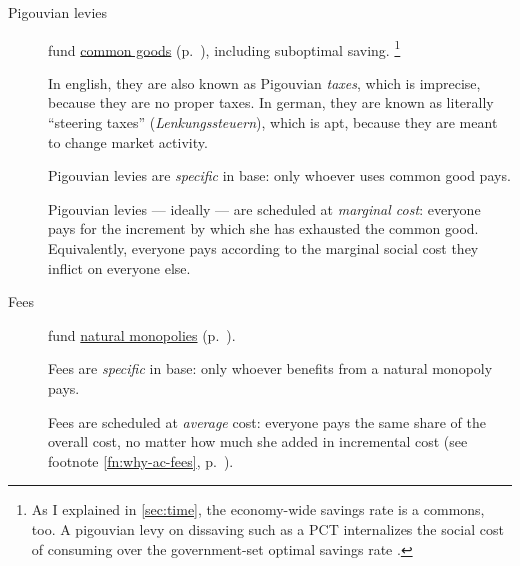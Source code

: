 \begin{description}
	\item[Pigouvian levies]  \label{sec:levies} fund \hyperref[sec:common-good]{common goods} (p.~\pageref{sec:common-good}), including suboptimal saving.
	\footnote{
		As I explained in \autoref{sec:time}, the economy-wide savings rate is a commons, too.
		A pigouvian levy on dissaving such as a \gls{PCT} internalizes the social cost of consuming over the government-set optimal savings rate \citep{Held2010a}.
	}

	In english, they are also known as Pigouvian \emph{taxes}, which is imprecise, because they are no proper taxes.
In german, they are known as literally ``steering taxes'' (\emph{Lenkungssteuern}), which is apt, because they are meant to change market activity.

	Pigouvian levies are \emph{specific} in base:
only whoever uses common good pays.

	Pigouvian levies --- ideally --- are scheduled at \emph{marginal cost}:
everyone pays for the increment by which she has exhausted the common good.
Equivalently, everyone pays according to the marginal social cost they inflict on everyone else.




	\item[Fees]  \label{sec:fees}
	fund \hyperref[sec:natural-monopoly]{natural monopolies} (p.~\pageref{sec:natural-monopoly}).

	Fees are \emph{specific} in base:
only whoever benefits from a natural monopoly pays.

	Fees are scheduled at \emph{average} cost:
everyone pays the same share of the overall cost, no matter how much she added in incremental cost (see footnote \ref{fn:why-ac-fees}, p.~\pageref{fn:why-ac-fees}).


\end{description}
